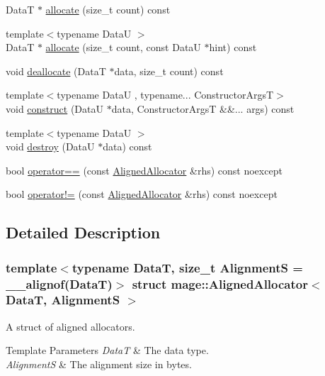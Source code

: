 \begin{DoxyCompactItemize}
DataT $\ast$ \hyperlink{structmage_1_1_aligned_allocator_aa40b7eb431ac79e6b09bbd9e55906e78}{allocate} (size\+\_\+t count) const
\item 
{\footnotesize template$<$typename DataU $>$ }\\DataT $\ast$ \hyperlink{structmage_1_1_aligned_allocator_ae7369bc87b8720a0433f8ceda2a52218}{allocate} (size\+\_\+t count, const DataU $\ast$hint) const
\item 
void \hyperlink{structmage_1_1_aligned_allocator_a7893ac09903ab7c8601e9db45715c5d7}{deallocate} (DataT $\ast$data, size\+\_\+t count) const
\item 
{\footnotesize template$<$typename DataU , typename... Constructor\+ArgsT$>$ }\\void \hyperlink{structmage_1_1_aligned_allocator_a1dab96378ee44579508c6722b9f6164c}{construct} (DataU $\ast$data, Constructor\+ArgsT \&\&... args) const
\item 
{\footnotesize template$<$typename DataU $>$ }\\void \hyperlink{structmage_1_1_aligned_allocator_a5334e1389c6018a91fdfe2db592d2b74}{destroy} (DataU $\ast$data) const
\item 
bool \hyperlink{structmage_1_1_aligned_allocator_a5abdcdde596e62320252b40bf93412d2}{operator==} (const \hyperlink{structmage_1_1_aligned_allocator}{Aligned\+Allocator} \&rhs) const noexcept
\item 
bool \hyperlink{structmage_1_1_aligned_allocator_aefd13c00b97c39f360051998f3005a49}{operator!=} (const \hyperlink{structmage_1_1_aligned_allocator}{Aligned\+Allocator} \&rhs) const noexcept
\end{DoxyCompactItemize}


\subsection{Detailed Description}
\subsubsection*{template$<$typename DataT, size\+\_\+t AlignmentS = \+\_\+\+\_\+alignof(\+Data\+T)$>$\newline
struct mage\+::\+Aligned\+Allocator$<$ Data\+T, Alignment\+S $>$}

A struct of aligned allocators.


\begin{DoxyTemplParams}{Template Parameters}
{\em DataT} & The data type. \\
\hline
{\em AlignmentS} & The alignment size in bytes. \\
\hline
\end{DoxyTemplParams}


